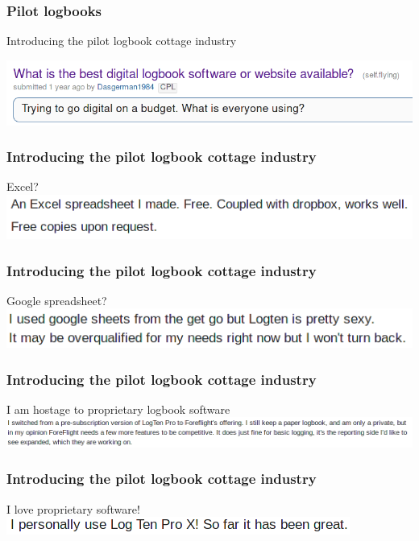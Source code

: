 \begin{frame}
\frametitle{Pilot logbooks}
\begin{center}
Introducing the pilot logbook cottage industry
\par
\includegraphics[height=0.1\textheight]{image/reddit-logbooks.png}
\end{center}
\end{frame}

\begin{frame}
\frametitle{Introducing the pilot logbook cottage industry}
\begin{block}{Excel?}
\includegraphics[height=0.1\textheight]{image/logbook-1.png}
\end{block}
\end{frame}

\begin{frame}
\frametitle{Introducing the pilot logbook cottage industry}
\begin{block}{Google spreadsheet?}
\includegraphics[height=0.1\textheight]{image/logbook-2.png}
\end{block}
\end{frame}

\begin{frame}
\frametitle{Introducing the pilot logbook cottage industry}
\begin{block}{I am hostage to proprietary logbook software}
\includegraphics[height=0.08\textheight]{image/logbook-3.png}
\end{block}
\end{frame}

\begin{frame}
\frametitle{Introducing the pilot logbook cottage industry}
\begin{block}{I love proprietary software!}
\includegraphics[height=0.05\textheight]{image/logbook-4.png}
\end{block}
\end{frame}


